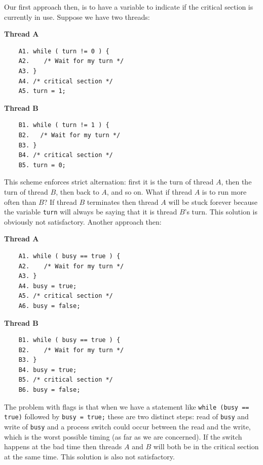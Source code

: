 \documentclass[a4paper]{report}
\begin{document}
Our first approach then, is to have a variable to indicate if the critical section is currently in use. Suppose we have two threads:

\begin{multicols}{2}
	\textbf{Thread A}\vspace{-2em}
	\begin{verbatim}
	A1. while ( turn != 0 ) {
	A2.    /* Wait for my turn */
	A3. }
	A4. /* critical section */
	A5. turn = 1;
	\end{verbatim}
	\columnbreak
	\textbf{Thread B}\vspace{-2em}
	\begin{verbatim}
	B1. while ( turn != 1 ) {
	B2.   /* Wait for my turn */
	B3. }
	B4. /* critical section */
	B5. turn = 0;
	\end{verbatim}
\end{multicols}

This scheme enforces strict alternation: first it is the turn of thread $A$, then the turn of thread $B$, then back to $A$, and so on. What if thread $A$ is to run more often than $B$? If thread $B$ terminates then thread $A$ will be stuck forever because the variable \texttt{turn} will always be saying that it is thread $B$'s turn. This solution is obviously not satisfactory. Another approach then:

\begin{multicols}{2}
	\textbf{Thread A}\vspace{-2em}
	\begin{verbatim}
	A1. while ( busy == true ) {
	A2.    /* Wait for my turn */
	A3. }
	A4. busy = true;
	A5. /* critical section */
	A6. busy = false;
	\end{verbatim}
	\columnbreak
	\textbf{Thread B}\vspace{-2em}
	\begin{verbatim}
	B1. while ( busy == true ) {
	B2.    /* Wait for my turn */
	B3. }
	B4. busy = true;
	B5. /* critical section */
	B6. busy = false;
	\end{verbatim}
\end{multicols}


The problem with flags is that when we have a statement like \texttt{while (busy == true)} followed by \texttt{busy = true;} these are two distinct steps: read of \texttt{busy} and write of \texttt{busy} and a process switch could occur between the read and the write, which is the worst possible timing (as far as we are concerned). If the switch happens at the bad time then threads $A$ and $B$ will both be in the critical section at the same time. This solution is also not satisfactory.
\end{document}
